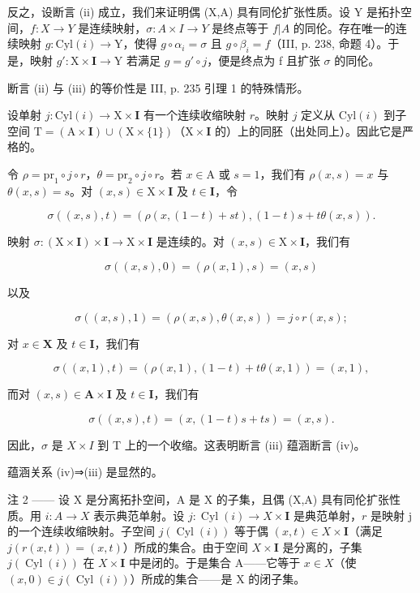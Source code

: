 反之，设断言 (ii) 成立，我们来证明偶 (X,A) 具有同伦扩张性质。设 Y 是拓扑空间，\(f:X\to Y\) 是连续映射，\(\sigma:A\times I\to Y\) 是终点等于 \(f|A\) 的同伦。存在唯一的连续映射 \(g:\mathrm{Cyl}(i)\to\mathrm{Y}\)，使得 \(g\circ\alpha_i=\sigma\) 且 \(g\circ\beta_i=f\)（III, p. 238, 命题 4）。于是，映射 \(g':\mathrm{X}\times\mathbf{I}\to\mathrm{Y}\) 若满足 \(g=g'\circ j\)，便是终点为 f 且扩张 \(\sigma\) 的同伦。

  断言 (ii) 与 (iii) 的等价性是 III, p. 235 引理 1 的特殊情形。

设单射 \(j\colon \mathrm{Cyl}(i)\to \mathrm{X}\times \mathbf{I}\) 有一个连续收缩映射 \(r\)。映射 \(j\) 定义从 \(\mathrm{Cyl}(i)\) 到子空间 \(\mathrm{T} = (\mathrm{A}\times \mathbf{I})\cup (\mathrm{X}\times \{1\})\)（\(\mathrm{X}\times \mathbf{I}\) 的）上的同胚（出处同上）。因此它是严格的。

令 \(\rho = \mathrm{pr}_1\circ j\circ r\)，\(\theta = \mathrm{pr}_2\circ j\circ r\)。若 \(x\in \mathrm{A}\) 或 \(s = 1\)，我们有 \(\rho (x,s) = x\) 与 \(\theta (x,s) = s\)。对 \((x,s)\in \mathrm{X}\times \mathbf{I}\) 及 \(t\in \mathbf{I}\)，令

\[
\sigma ((x, s), t) = (\rho (x, (1 - t) + s t), (1 - t) s + t \theta (x, s)).
\]

映射 \(\sigma\colon(\mathrm{X}\times\mathbf{I})\times\mathbf{I}\to\mathrm{X}\times\mathbf{I}\) 是连续的。对 \((x,s)\in\mathrm{X}\times\mathbf{I}\)，我们有

\[
\sigma ((x, s), 0) = (\rho (x, 1), s) = (x, s)
\]

以及

\[
\sigma ((x, s), 1) = (\rho (x, s), \theta (x, s)) = j \circ r (x, s);
\]

对 \(x\in \mathbf{X}\) 及 \(t\in \mathbf{I}\)，我们有

\[
\sigma ((x, 1), t) = (\rho (x, 1), (1 - t) + t \theta (x, 1)) = (x, 1),
\]

而对 \((x,s)\in\mathbf{A}\times\mathbf{I}\) 及 \(t\in\mathbf{I}\)，我们有

\[
\sigma ((x, s), t) = (x, (1 - t) s + t s) = (x, s).
\]

因此，\(\sigma\) 是 \(X\times I\) 到 T 上的一个收缩。这表明断言 (iii) 蕴涵断言 (iv)。

蕴涵关系 (iv)⇒(iii) 是显然的。

注 2 —— 设 X 是分离拓扑空间，A 是 X 的子集，且偶 (X,A) 具有同伦扩张性质。用 \(i\colon A\to X\) 表示典范单射。设 \(j\colon\operatorname{Cyl}(i)\to X\times\mathbf{I}\) 是典范单射，\(r\) 是映射 j 的一个连续收缩映射。子空间 \(j(\operatorname{Cyl}(i))\) 等于偶 \((x,t)\in X\times\mathbf{I}\)（满足 \(j(r(x,t))=(x,t)\)）所成的集合。由于空间 \(X\times\mathbf{I}\) 是分离的，子集 \(j(\operatorname{Cyl}(i))\) 在 \(X\times\mathbf{I}\) 中是闭的。于是集合 A——它等于 \(x\in X\)（使 \((x,0)\in j(\operatorname{Cyl}(i))\)）所成的集合——是 X 的闭子集。

